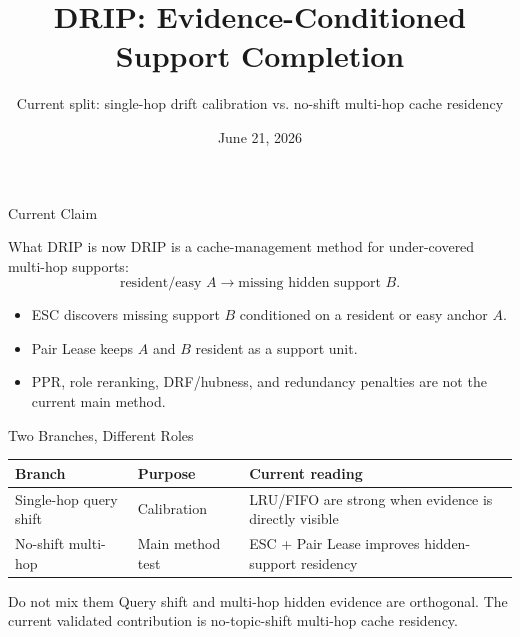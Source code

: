\documentclass[aspectratio=169,10pt]{beamer}
\title[DRIP]{DRIP: Evidence-Conditioned Support Completion}
\subtitle{Current split: single-hop drift calibration vs. no-shift multi-hop cache residency}
\author{}
\date{June 21, 2026}
\begin{document}
\begin{frame}
  \titlepage
\end{frame}

\begin{frame}{Current Claim}
  \begin{block}{What DRIP is now}
    DRIP is a cache-management method for under-covered multi-hop supports:
    \[
      \text{resident/easy } A \rightarrow \text{missing hidden support } B.
    \]
  \end{block}

  \begin{itemize}
    \item ESC discovers missing support $B$ conditioned on a resident or easy anchor $A$.
    \item Pair Lease keeps $A$ and $B$ resident as a support unit.
    \item PPR, role reranking, DRF/hubness, and redundancy penalties are not the current main method.
  \end{itemize}
\end{frame}

\begin{frame}{Two Branches, Different Roles}
  \begin{table}
  \centering
  \small
  \begin{tabular}{lll}
    \toprule
    Branch & Purpose & Current reading \\
    \midrule
    Single-hop query shift & Calibration & LRU/FIFO are strong when evidence is directly visible \\
    No-shift multi-hop & Main method test & ESC + Pair Lease improves hidden-support residency \\
    \bottomrule
  \end{tabular}
  \end{table}

  \begin{alertblock}{Do not mix them}
    Query shift and multi-hop hidden evidence are orthogonal. The current
    validated contribution is no-topic-shift multi-hop cache residency.
  \end{alertblock}
\end{frame}
\end{document}
